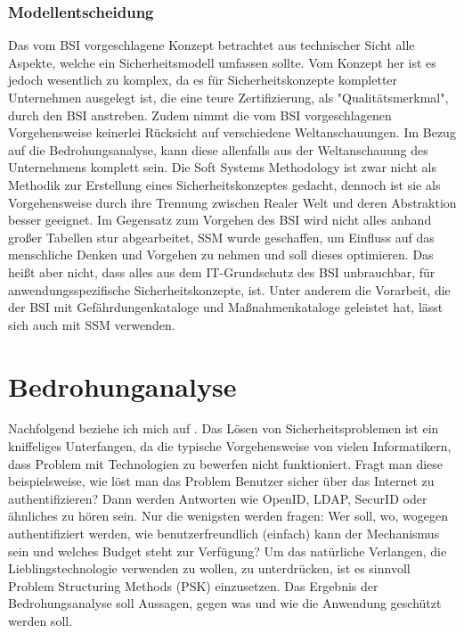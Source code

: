 \documentclass[11pt,a4paper]{report}
\begin{document}
\subsection{Modellentscheidung}

Das vom BSI vorgeschlagene Konzept betrachtet aus technischer Sicht alle Aspekte, welche ein Sicherheitsmodell umfassen sollte. Vom Konzept her ist es jedoch wesentlich zu komplex, da es für Sicherheitskonzepte kompletter Unternehmen ausgelegt ist, die eine teure Zertifizierung, als "Qualitätsmerkmal", durch den BSI anstreben. Zudem nimmt die vom BSI vorgeschlagenen Vorgehensweise keinerlei Rücksicht auf verschiedene Weltanschauungen. Im Bezug auf die Bedrohungsanalyse, kann diese allenfalls aus der Weltanschauung des Unternehmens komplett sein. Die Soft Systems Methodology ist zwar nicht als Methodik zur Erstellung eines Sicherheitskonzeptes gedacht, dennoch ist sie als Vorgehensweise durch ihre Trennung zwischen Realer Welt und deren Abstraktion besser geeignet. Im Gegensatz zum Vorgehen des BSI wird nicht alles anhand großer Tabellen stur abgearbeitet, SSM wurde geschaffen, um Einfluss auf das menschliche Denken und Vorgehen zu nehmen und soll dieses optimieren. Das heißt aber nicht, dass alles aus dem IT-Grundschutz des BSI unbrauchbar, für anwendungsspezifische Sicherheitskonzepte, ist. Unter anderem die Vorarbeit, die der BSI mit Gefährdungenkataloge und Maßnahmenkataloge geleistet hat, lässt sich auch mit SSM verwenden.

\chapter{Bedrohunganalyse} \label{chap:analysis}

Nachfolgend beziehe ich mich auf \cite{gutmann9}.
Das Lösen von Sicherheitsproblemen ist ein kniffeliges Unterfangen, da die typische Vorgehensweise von vielen Informatikern, dass Problem mit Technologien zu bewerfen nicht funktioniert. Fragt man diese beispielsweise, wie löst man das Problem Benutzer sicher über das Internet zu authentifizieren? Dann werden Antworten wie OpenID, LDAP, SecurID oder ähnliches zu hören sein. Nur die wenigsten werden fragen: Wer soll, wo, wogegen authentifiziert werden, wie benutzerfreundlich (einfach) kann der Mechanismus sein und welches Budget steht zur Verfügung? Um das natürliche Verlangen, die Lieblingstechnologie verwenden zu wollen, zu unterdrücken, ist es sinnvoll Problem Structuring Methods (PSK) einzusetzen. Das Ergebnis der Bedrohungsanalyse soll Aussagen, gegen was und wie die Anwendung geschützt werden soll.
\end{document}
